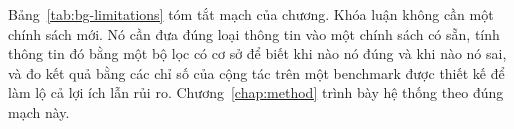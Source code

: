 Bảng~\ref{tab:bg-limitations} tóm tắt mạch của chương. Khóa luận không cần một chính sách mới. Nó cần đưa đúng loại thông tin vào một chính sách có sẵn, tính thông tin đó bằng một bộ lọc có cơ sở để biết khi nào nó đúng và khi nào nó sai, và đo kết quả bằng các chỉ số của cộng tác trên một benchmark được thiết kế để làm lộ cả lợi ích lẫn rủi ro. Chương~\ref{chap:method} trình bày hệ thống theo đúng mạch này.
